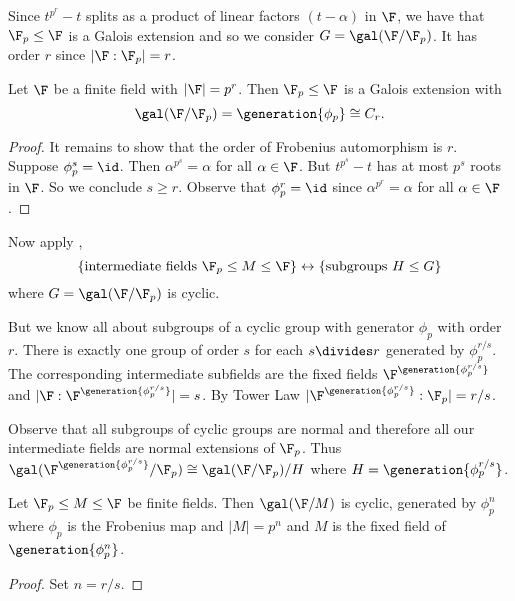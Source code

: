 \documentclass[a4paper]{article}
\begin{document}
Since \(t^{p^r} - t\) splits as a product of linear factors \((t - \alpha)\) in \(\F\), we have that \(\F_p \leq \F\) is a Galois extension and so we consider \(G = \gal(\F/\F_p)\). It has order \(r\) since \(|\F:\F_p| = r\).

\begin{theorem}
  Let \(\F\) be a finite field with \(|\F| = p^r\). Then \(\F_p \leq \F\) is a Galois extension with
  \[
    \gal(\F/\F_p) = \generation{\phi_p} \cong C_r.
  \]
\end{theorem}

\begin{proof}
  It remains to show that the order of Frobenius automorphism is \(r\). Suppose \(\phi_p^s = \id\). Then \(\alpha^{p^s} = \alpha\) for all \(\alpha \in \F\). But \(t^{p^s} - t\) has at most \(p^s\) roots in \(\F\). So we conclude \(s \geq r\). Observe that \(\phi_p^r = \id\) since \(\alpha^{p^r} = \alpha\) for all \(\alpha \in \F\).
\end{proof}

Now apply ,
\[
  \{\text{intermediate fields } \F_p \leq M \leq \F\} \leftrightarrow \{\text{subgroups } H \leq G \}
\]
where \(G = \gal(\F/\F_p)\) is cyclic.

But we know all about subgroups of a cyclic group with generator \(\phi_p\) with order \(r\). There is exactly one group of order \(s\) for each \(s \divides r\) generated by \(\phi_p^{r/s}\). The corresponding intermediate subfields are the fixed fields \(\F^{\generation{\phi_p^{r/s}}}\) and \(|\F:\F^{\generation{\phi_p^{r/s}}}| = s\). By Tower Law \(|\F^{\generation{\phi_p^{r/s}}}:\F_p| = r/s\).

Observe that all subgroups of cyclic groups are normal and therefore all our intermediate fields are normal extensions of \(\F_p\). Thus \(\gal(\F^{\generation{\phi_p^{r/s}}}/\F_p) \cong \gal(\F/\F_p)/H\) where \(H = \generation{\phi_p^{r/s}}\).

\begin{corollary}
  \label{cor:galois group of finite fields}
  Let \(\F_p \leq M \leq \F\) be finite fields. Then \(\gal(\F/M)\) is cyclic, generated by \(\phi_p^n\) where \(\phi_p\) is the Frobenius map and \(|M| = p^n\) and \(M\) is the fixed field of \(\generation{\phi_p^n}\).
\end{corollary}

\begin{proof}
  Set \(n = r/s\).
\end{proof}
\end{document}
